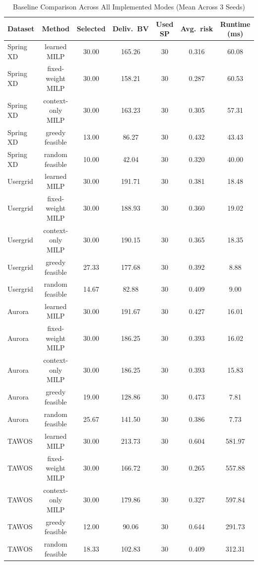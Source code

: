 \documentclass[conference]{IEEEtran}
\begin{document}
\begin{table}[t]
	\caption{Baseline Comparison Across All Implemented Modes (Mean Across 3 Seeds)}
	\label{tab:baseline-comparison}
	\centering\scriptsize
	\begin{tabular}{lcccccc}
		\toprule
		Dataset   & Method            & Selected & Deliv.\ BV & Used SP & Avg.\ risk & Runtime (ms) \\
		\midrule
		Spring XD & learned MILP      & 30.00    & 165.26     & 30      & 0.316      & 60.08        \\
		Spring XD & fixed-weight MILP & 30.00    & 158.21     & 30      & 0.287      & 60.53        \\
		Spring XD & context-only MILP & 30.00    & 163.23     & 30      & 0.305      & 57.31        \\
		Spring XD & greedy feasible   & 13.00    & 86.27      & 30      & 0.432      & 43.43        \\
		Spring XD & random feasible   & 10.00    & 42.04      & 30      & 0.320      & 40.00        \\
		Usergrid  & learned MILP      & 30.00    & 191.71     & 30      & 0.381      & 18.48        \\
		Usergrid  & fixed-weight MILP & 30.00    & 188.93     & 30      & 0.360      & 19.02        \\
		Usergrid  & context-only MILP & 30.00    & 190.15     & 30      & 0.365      & 18.35        \\
		Usergrid  & greedy feasible   & 27.33    & 177.68     & 30      & 0.392      & 8.88         \\
		Usergrid  & random feasible   & 14.67    & 82.88      & 30      & 0.409      & 9.00         \\
		Aurora    & learned MILP      & 30.00    & 191.67     & 30      & 0.427      & 16.01        \\
		Aurora    & fixed-weight MILP & 30.00    & 186.25     & 30      & 0.393      & 16.02        \\
		Aurora    & context-only MILP & 30.00    & 186.25     & 30      & 0.393      & 15.83        \\
		Aurora    & greedy feasible   & 19.00    & 128.86     & 30      & 0.473      & 7.81         \\
		Aurora    & random feasible   & 25.67    & 141.50     & 30      & 0.386      & 7.73         \\
		TAWOS     & learned MILP      & 30.00    & 213.73     & 30      & 0.604      & 581.97       \\
		TAWOS     & fixed-weight MILP & 30.00    & 166.72     & 30      & 0.265      & 557.88       \\
		TAWOS     & context-only MILP & 30.00    & 179.86     & 30      & 0.327      & 597.84       \\
		TAWOS     & greedy feasible   & 12.00    & 90.06      & 30      & 0.644      & 291.73       \\
		TAWOS     & random feasible   & 18.33    & 102.83     & 30      & 0.409      & 312.31       \\
		\bottomrule
	\end{tabular}
\end{table}
\end{document}
